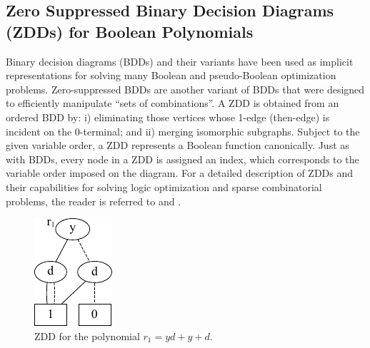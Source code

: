 \subsection{Zero Suppressed Binary Decision Diagrams (ZDDs) for
  Boolean Polynomials}


Binary decision diagrams (BDDs) \cite{BRYA86} and
their variants 
have been used as implicit representations for solving many
Boolean and pseudo-Boolean optimization problems. Zero-suppressed BDDs
\cite{zbdd} are another variant of BDDs that were designed to
efficiently manipulate ``sets of combinations''. A ZDD is obtained
from an ordered BDD by: i) eliminating those vertices whose 1-edge
(then-edge) is incident on the 0-terminal; and ii) merging isomorphic
subgraphs. Subject to the given variable order, a ZDD represents a 
Boolean function canonically. Just as with BDDs, every node in a ZDD
is assigned an index, which corresponds to the variable order imposed
on the diagram. For a detailed description of ZDDs and
their capabilities for solving logic optimization and sparse
combinatorial problems, the reader is referred to \cite{zbdd} and
\cite{zbdd_unate}. 

\begin{figure}[hbt]
\centering
\includegraphics[scale=1]{figures/r1_clean.pdf}
\caption{ZDD for the polynomial $r_1 = yd + y + d$.}
\label{r1}
\end{figure}

